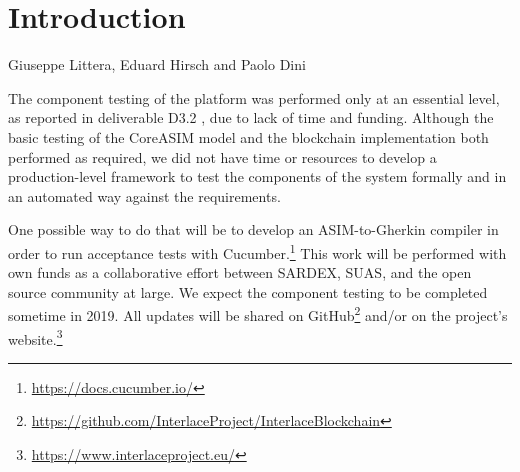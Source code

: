 \chapter{Introduction}
\label{ch:Introduction}

\vspace{-1cm}
\begin{center}
Giuseppe Littera, Eduard Hirsch and Paolo Dini
\end{center}

The component testing of the platform was performed only at an essential level, as reported in deliverable D3.2 \cite{INTERLACE_D32}, due to lack of time and funding. Although the basic testing of the CoreASIM model and the blockchain implementation both performed as required, we did not have time or resources to develop a production-level framework to test the components of the system formally and in an automated way against the requirements.

One possible way to do that will be to develop an ASIM-to-Gherkin compiler in order to run acceptance tests with Cucumber.\footnote{\url{https://docs.cucumber.io/}}  This work will be performed with own funds as a collaborative effort between SARDEX, SUAS, and the open source community at large. We expect the component testing to be completed sometime in 2019. All updates will be shared on GitHub\footnote{\url{https://github.com/InterlaceProject/InterlaceBlockchain}} and/or on the project's website.\footnote{\url{https://www.interlaceproject.eu/}} 

\newpage
